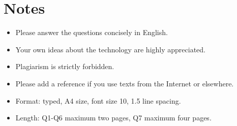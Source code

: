 \documentclass{article}
\begin{document}
\section*{Notes}

\begin{itemize}
\item Please answer the questions concisely in English.
\item Your own ideas about the technology are highly appreciated.
\item Plagiarism is strictly forbidden.
\item Please add a reference if you use texts from the Internet or elsewhere.
\item Format: typed, A4 size, font size 10, 1.5 line spacing.
\item Length: Q1-Q6 maximum two pages, Q7 maximum four pages.
\end{itemize}
\end{document}
